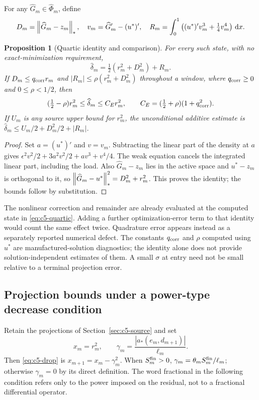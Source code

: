 \documentclass[11pt]{article}
\newtheorem{proposition}[theorem]{Proposition}
\theoremstyle{remark}
\begin{document}
For any $\widehat G_m\in\widehat\Phi_m$, define
\[
 D_m=\left\lVert\widehat G_m-z_m\right\rVert_*,\quad
 v_m=\widehat G_m'-(u^*)',\quad
 R_m=\int_0^1\left((u^*)'v_m^3+\tfrac14v_m^4\right)\,\mathrm d x .
\]
\begin{proposition}[Quartic identity and comparison]
\label{prop:c5-quartic}
For every such state, with no exact-minimization requirement,
\begin{equation}
 \widehat\delta_m=\tfrac12(r_m^2+D_m^2)+R_m.
 \label{eq:c5-quartic}
\end{equation}
If $D_m\leq q_{\rm corr}r_m$ and
$|R_m|\leq\rho(r_m^2+D_m^2)$ throughout a window, where
$q_{\rm corr}\geq0$ and $0\leq\rho<1/2$, then
\begin{equation}
 (\tfrac12-\rho)r_m^2\leq\widehat\delta_m
 \leq C_Er_m^2,\qquad C_E=(\tfrac12+\rho)(1+q_{\rm corr}^2).
 \label{eq:c5-quartic-comparison}
\end{equation}
If $U_m$ is any source upper bound for $r_m^2$, the unconditional
additive estimate is
$\widehat\delta_m\leq U_m/2+D_m^2/2+|R_m|$.
\end{proposition}
\begin{proof}
Set $a=(u^*)'$ and $v=v_m$. Subtracting the linear part of the density
at $a$ gives
$\epsilon^2v^2/2+3a^2v^2/2+av^3+v^4/4$.
The weak equation cancels the integrated linear part, including the load.
Also $\widehat G_m-z_m$ lies in the active space and
$u^*-z_m$ is orthogonal to it, so
$\left\lVert\widehat G_m-u^*\right\rVert_*^2=D_m^2+r_m^2$.
This proves the identity; the bounds follow by substitution.
\end{proof}

The nonlinear correction and remainder are already evaluated at the computed
state in \eqref{eq:c5-quartic}. Adding a further optimization-error term
to that identity would count the same effect twice.
Quadrature error appears instead as a separately reported numerical defect.
The constants $q_{\rm corr}$ and $\rho$ computed using $u^*$ are
manufactured-solution diagnostics; the identity alone does not provide
solution-independent estimates of them. A small $\sigma$ at entry need
not be small relative to a terminal projection error.

\subsection{Projection bounds under a power-type decrease condition}
\label{sec:c5-power}

Retain the projections of Section~\ref{sec:c5-source} and set
\[
 x_m=r_m^2,\qquad
 \gamma_m=\frac{|a_*(e_m,d_{m+1})|}{\ell_m}.
\]
Then \eqref{eq:c5-drop} is $x_{m+1}=x_m-\gamma_m^2$.
When $S_m^{\rm fin}>0$, $\gamma_m=\theta_mS_m^{\rm fin}/\ell_m$;
otherwise $\gamma_m=0$ by its direct definition.
The word fractional in the following condition refers only to the power
imposed on the residual, not to a fractional differential operator.
\end{document}
